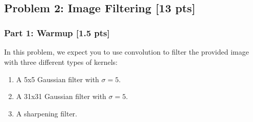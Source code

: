 \documentclass[11pt]{article}
\providecommand{\tightlist}{%
      \setlength{\itemsep}{0pt}\setlength{\parskip}{0pt}}
\begin{document}
    \begin{center}
    \end{center}
    { \hspace*{\fill} \\}
    
    \begin{center}
    \end{center}
    { \hspace*{\fill} \\}
    
    \begin{center}
    \end{center}
    { \hspace*{\fill} \\}
    
    \begin{center}
    \end{center}
    { \hspace*{\fill} \\}
    
    \hypertarget{problem-2-image-filtering-13-pts}{%
\subsection{Problem 2: Image Filtering {[}13
pts{]}}\label{problem-2-image-filtering-13-pts}}

\hypertarget{part-1-warmup-1.5-pts}{%
\subsubsection{Part 1: Warmup {[}1.5
pts{]}}\label{part-1-warmup-1.5-pts}}

In this problem, we expect you to use convolution to filter the provided
image with three different types of kernels:

\begin{enumerate}
\def\labelenumi{\arabic{enumi}.}
\tightlist
\item
  A 5x5 Gaussian filter with \(\sigma = 5\).
\item
  A 31x31 Gaussian filter with \(\sigma = 5\).
\item
  A sharpening filter.
\end{enumerate}
\end{document}
